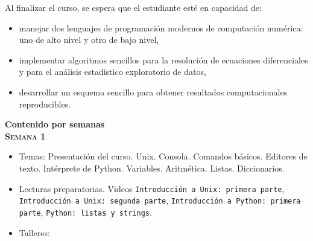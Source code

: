 \documentclass[letterpaper,10pt,onecolumn]{article}
\begin{document}

\noindent\normalsize Al finalizar el curso, se espera que el
estudiante est\'e en capacidad de: 

\begin{itemize}
\item manejar dos lenguajes de programaci\'on modernos de
  computaci\'on num\'erica: uno de alto
  nivel y otro de bajo nivel,\\[-0.6cm] 
\item implementar algoritmos sencillos para la resoluci\'on de
  ecuaciones diferenciales y para el an\'alisis estad\'istico
  exploratorio de datos, \\[-0.6cm]   
\item desarrollar un esquema sencillo para obtener resultados
  computacionales reproducibles.\\[-0.6cm]  
\end{itemize}

\vspace*{0.5cm} 

\noindent\textbf{\large {} \quad Contenido por
  semanas}\\[-0.2cm]  


\noindent\textbf{\textsc{Semana 1}}\\[-0.5cm]
\begin{itemize}
\item Temas: 
Presentaci\'on del curso. Unix. Consola. Comandos b\'asicos. Editores
de texto. Int\'erprete de
Python. Variables. Aritm\'etica. Listas. Diccionarios.\\[-0.6cm] 
\item Lecturas preparatorias. Videos \texttt{Introducci\'on a Unix:
  primera parte}, \texttt{Introducci\'on a Unix: segunda parte},
  \texttt{Introducci\'on a Python: primera parte}, \texttt{Python:
    listas y strings}.\\[-0.6cm] 
\item Talleres: 
\\[-0.6cm]
\end{itemize}
\end{document}
